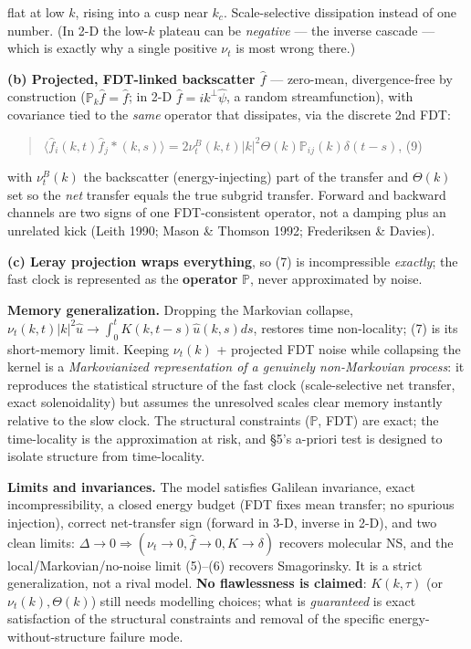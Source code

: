 \documentclass[11pt]{article}
\begin{document}
flat at low $k$, rising into a cusp near $k_{c}$. Scale-selective dissipation instead of one number. (In 2-D the low-$k$ plateau can be \emph{negative} — the inverse cascade — which is exactly why a single positive $\nu _{t}$ is most wrong there.)


\textbf{(b) Projected, FDT-linked backscatter $\hat{f}$} — zero-mean, divergence-free by construction ($\mathbb{P}_{k} \hat{f}=\hat{f}$; in 2-D $\hat{f}=ik^\perp \hat{\psi }$, a random streamfunction), with covariance tied to the \emph{same} operator that dissipates, via the discrete 2nd FDT:


\begin{quote}
$\langle \hat{f}_{i}(k,t)\hat{f}_{j}*(k,s)\rangle  = 2 \nu _{t}^{B}(k,t)|k|^{2} \Theta (k) \mathbb{P}_{ij}(k) \delta (t-s)$, (9)
\end{quote}


with $\nu _{t}^{B}(k)$ the backscatter (energy-injecting) part of the transfer and $\Theta (k)$ set so the \emph{net} transfer equals the true subgrid transfer. Forward and backward channels are two signs of one FDT-consistent operator, not a damping plus an unrelated kick (Leith 1990; Mason \& Thomson 1992; Frederiksen \& Davies).


\textbf{(c) Leray projection wraps everything}, so (7) is incompressible \emph{exactly}; the fast clock is represented as the \textbf{operator} $\mathbb{P}$, never approximated by noise.


\textbf{Memory generalization.} Dropping the Markovian collapse, $\nu _{t}(k,t)|k|^{2}\hat{u} \longrightarrow  \int _{0}^{t} K(k,t-s)\hat{u}(k,s)ds$, restores time non-locality; (7) is its short-memory limit. Keeping $\nu _{t}(k)$ + projected FDT noise while collapsing the kernel is a \emph{Markovianized representation of a genuinely non-Markovian process}: it reproduces the statistical structure of the fast clock (scale-selective net transfer, exact solenoidality) but assumes the unresolved scales clear memory instantly relative to the slow clock. The structural constraints ($\mathbb{P}$, FDT) are exact; the time-locality is the approximation at risk, and §5's a-priori test is designed to isolate structure from time-locality.


\textbf{Limits and invariances.} The model satisfies Galilean invariance, exact incompressibility, a closed energy budget (FDT fixes mean transfer; no spurious injection), correct net-transfer sign (forward in 3-D, inverse in 2-D), and two clean limits: $\Delta \to 0 \Rightarrow  (\nu _{t}\to 0, \hat{f}\to 0, K\to \delta )$ recovers molecular NS, and the local/Markovian/no-noise limit (5)–(6) recovers Smagorinsky. It is a strict generalization, not a rival model. \textbf{No flawlessness is claimed}: $K(k,\tau )$ (or $\nu _{t}(k), \Theta (k)$) still needs modelling choices; what is \emph{guaranteed} is exact satisfaction of the structural constraints and removal of the specific energy-without-structure failure mode.
\end{document}
